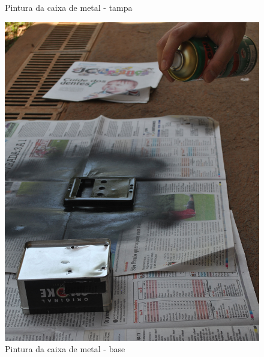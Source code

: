 \documentclass[
		12pt,				%
		openright,			%
		oneside,			%
		a4paper,			%
		chapter=TITLE,		%
		english,			%
		brazil				%
	]{abntex2}
\begin{document}
\begin{figure}[htb]
	\centering
 	\begin{minipage}{0.47\textwidth}
		\centering
		\caption{\label{fig:pintar-1}Pintura da caixa de metal - tampa}
		\includegraphics[width=1\textwidth]{img/pintar-1.jpg}
	\end{minipage}
	\hfill
	\begin{minipage}{0.47\textwidth}
		\centering
		\caption{\label{fig:pintar-2}Pintura da caixa de metal - base}

\end{minipage}
\end{figure}
\end{document}
